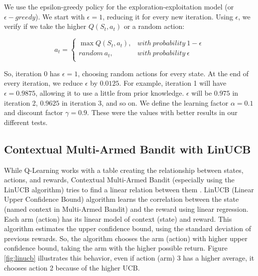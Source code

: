 We use the epsilon-greedy policy for the exploration-exploitation model (or $\epsilon-greedy$). We start with $\epsilon = 1$, reducing it for every new iteration. Using $\epsilon$, we verify if we take the higher $Q(S_t, a_t)$ or a random action:

\begin{equation}
    a_t = \begin{cases}
        \max Q(S_t, a_t), & with\ probability\ 1 - \epsilon \\
        random\ a_t, & with\ probability\ \epsilon \\
    \end{cases}
\end{equation}

So, iteration 0 has $\epsilon = 1$, choosing random actions for every state. At the end of every iteration, we reduce $\epsilon$ by $0.0125$. For example, iteration 1 will have $\epsilon = 0.9875$, allowing it to use a little from prior knowledge. $\epsilon$ will be $0.975$ in iteration 2, $0.9625$ in iteration 3, and so on. We define the learning factor $\alpha = 0.1$ and discount factor $\gamma = 0.9$. These were the values with better results in our different tests.

\subsection{Contextual Multi-Armed Bandit with LinUCB}

While Q-Learning works with a table creating the relationship between states, actions, and rewards, Contextual Multi-Armed Bandit (especially using the LinUCB algorithm) tries to find a linear relation between them \cite{li2010contextual}. LinUCB (Linear Upper Confidence Bound) algorithm learns the correlation between the state (named context in Multi-Armed Bandit) and the reward using linear regression. Each arm (action) has its linear model of context (state) and reward. This algorithm estimates the upper confidence bound, using the standard deviation of previous rewards. So, the algorithm chooses the arm (action) with higher upper confidence bound, taking the arm with the higher possible return. Figure \ref{fig:linucb} illustrates this behavior, even if action (arm) 3 has a higher average, it chooses action 2 because of the higher UCB.

